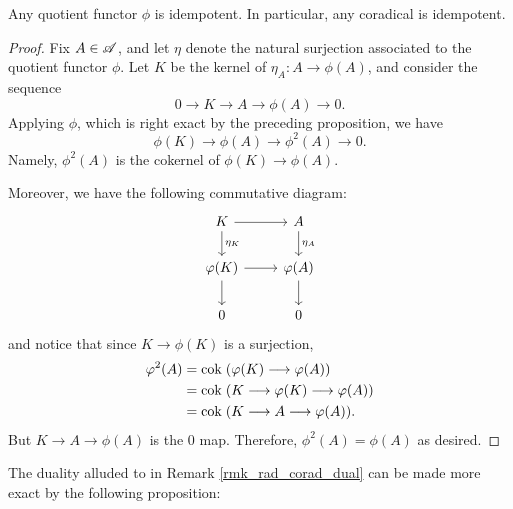 \begin{prop}\label{prop_idempotence}
Any quotient functor $\phi$ is idempotent. In particular, any 
coradical is idempotent.
\end{prop}
\begin{proof}
Fix $A \in \mathscr{A}$, and let $\eta$ denote the natural surjection 
associated to the quotient functor $\phi$. Let $K$ be the kernel 
of $\eta_A: A \to \phi(A)$, and consider the sequence
\[
0 \to K \to A \to \phi(A) \to 0.
\]
Applying $\phi$, which is right exact by the preceding 
proposition, we have
\[
\phi(K) \to \phi(A) \to \phi^2(A) \to 0.
\]
Namely, $\phi^2(A)$ is the cokernel of $\phi(K) \to \phi(A)$.

Moreover, we have the following commutative diagram:
\[
\begin{tikzcd}
K \arrow{r} \arrow{d}{\eta_K} &
A \arrow{d}{\eta_A} \\
\phi(K) \arrow{r} \arrow{d} &
\phi(A) \arrow{d} \\
0 & 0
\end{tikzcd}
\]
and notice that since $K \to \phi(K)$ is a surjection,
\begin{align*}
\varphi^2(A) &= \mathrm{cok}\; (\varphi(K) \longrightarrow \varphi(A)) \\
          &= \mathrm{cok}\; (K \longrightarrow \varphi(K) \longrightarrow \varphi(A)) \\
          &= \mathrm{cok}\; (K \longrightarrow A \longrightarrow \varphi(A)).
\end{align*}
But $K \to A \to \phi(A)$ is the $0$ map. Therefore, $\phi^2(A) = 
\phi(A)$ as desired.
\end{proof}

The duality alluded to in Remark \ref{rmk_rad_corad_dual} can
be made more exact by the following proposition:

